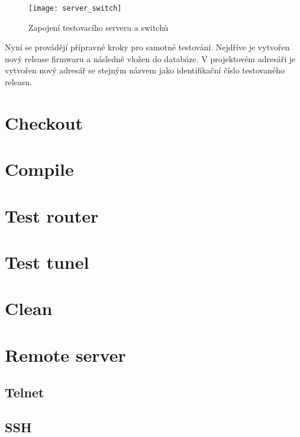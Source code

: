 \begin{figure}[h]
  \centering
  \texttt{[image: server\_switch]}
  \caption{Zapojení testovacího serveru a switchů}
  \label{fig:server_switch}
\end{figure}


Nyní se provádějí přípravné kroky pro samotné testování. Nejdříve je vytvořen nový release firmwaru a následně vložen do databáze. V projektovém adresáři je vytvořen nový adresář se stejným názvem jako identifikační číslo testovaného releasu.

\section{Checkout}
\section{Compile}
\section{Test router}
\section{Test tunel}
\section{Clean}
\section{Remote server}
\subsection{Telnet}
\subsection{SSH}

\endinput
